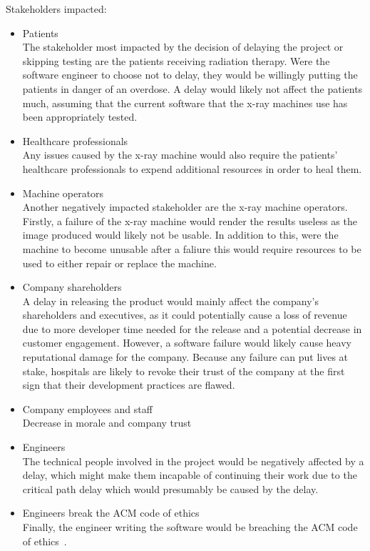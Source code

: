 \documentclass[11pt]{article}
\begin{document}
Stakeholders impacted: \begin{itemize}

    \item Patients\\
    The stakeholder most impacted by the decision of delaying the project or skipping testing are the patients receiving radiation therapy. Were the software engineer to choose not to delay, they would be willingly putting the patients in danger of an overdose. A delay would likely not affect the patients much, assuming that the current software that the x-ray machines use has been appropriately tested.

    \item Healthcare professionals\\
    Any issues caused by the x-ray machine would also require the patients' healthcare professionals to expend additional resources in order to heal them.

    \item Machine operators\\
    Another negatively impacted stakeholder are the x-ray machine operators. Firstly, a failure of the x-ray machine would render the results useless as the image produced would likely not be usable. In addition to this, were the machine to become unusable after a faliure this would require resources to be used to either repair or replace the machine.

    \item Company shareholders\\
    A delay in releasing the product would mainly affect the company's shareholders and executives, as it could potentially cause a loss of revenue due to more developer time needed for the release and a potential decrease in customer engagement. However, a software failure would likely cause heavy reputational damage for the company. Because any failure can put lives at stake, hospitals are likely to revoke their trust of the company at the first sign that their development practices are flawed.

    \item Company employees and staff\\
    Decrease in morale and company trust

    \item Engineers\\
    The technical people involved in the project would be negatively affected by a delay, which might make them incapable of continuing their work due to the critical path delay which would presumably be caused by the delay.

    \item Engineers break the ACM code of ethics\\
    Finally, the engineer writing the software would be breaching the ACM code of ethics~\cite{acm-ethics}.

\end{itemize}
\end{document}
